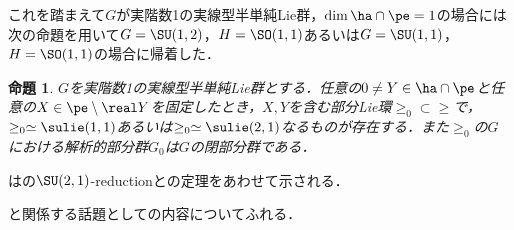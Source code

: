 \documentclass[12pt,dvipdfmx,uplatex]{jsarticle}
\newcounter{countabst}
\newtheorem{prop-a}[countabst]{命題}
\begin{document}
これを踏まえて$G$が実階数1の実線型半単純Lie群，$\dim \ha\cap\pe =1 $の場合には次の命題を用いて$G = \SU(1,2) $，$H= \SO(1,1)$あるいは$G = \SU(1,1) $，$H= \SO(1,1)$の場合に帰着した．

\begin{prop-a}\label{prop:reduction}
  $G$を実階数1の実線型半単純Lie群とする．任意の$0\neq Y\in \ha\cap\pe $と任意の$X\in \pe\setminus \real Y$を固定したとき，$X,Y$を含む部分Lie環$\ge_0\subset \ge$で，$\ge_0\simeq \sulie(1,1) $あるいは$\ge_0\simeq \sulie(2,1)$なるものが存在する．また$\ge_0$の$G$における解析的部分群$G_0$は$G$の閉部分群である．
\end{prop-a}
\vspace{-0.5em}
は\cite[p.~409]{hel01}の{$\SU(2,1) $-reduction}と\cite{yos38}の定理をあわせて示される．


と関係する話題として\cite{ber88}の内容についてふれる．
\end{document}
